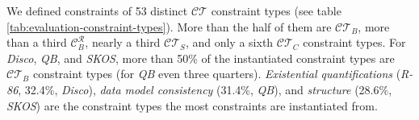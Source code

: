 \documentclass{llncs}
\begin{document}
{%
We defined constraints of 53 distinct $\mathcal{CT}$ constraint types (see table \ref{tab:evaluation-constraint-types}).
More than the half of them are $\mathcal{CT}_{B}$, more than a third $\mathcal{C}_B ^{\mathcal{R}}$, nearly a third $\mathcal{CT}_{S}$, and only a sixth $\mathcal{CT}_{C}$ constraint types.
For \emph{Disco}, \emph{QB}, and \emph{SKOS}, more than 50\% of the instantiated constraint types are $\mathcal{CT}_{B}$ constraint types 
(for \emph{QB} even three quarters).
\emph{Existential quantifications} (\emph{R-86}, 32.4\%, \emph{Disco}), \emph{data model consistency} (31.4\%, \emph{QB}), and \emph{structure} (28.6\%, \emph{SKOS}) are the constraint types the most constraints are instantiated from.

}
\end{document}

